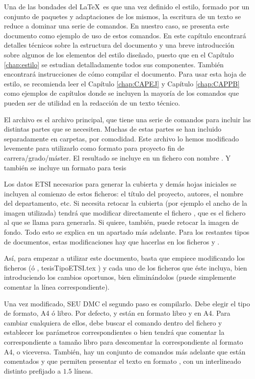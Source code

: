 Una de las bondades del \LaTeX\ es que una vez definido el estilo, formado por un conjunto de paquetes y adaptaciones de los mismos, la escritura de un texto se reduce a dominar una serie de comandos. En nuestro caso, se presenta este documento como ejemplo de uso de estos comandos. En este capítulo encontrará detalles técnicos sobre la estructura del documento y una breve introducción sobre algunos de los elementos del estilo diseñado, puesto que en el Capítulo \ref{chap:estilo} se estudian detalladamente todos sus componentes. También encontrará instrucciones de cómo compilar el documento. Para usar esta hoja de estilo, se recomienda leer el Capítulo \ref{chap:CAPEJ} y Capítulo \ref{chap:CAPPB} como ejemplos de capítulos donde se incluyen la mayoría de los comandos que pueden ser de utilidad en la redacción de un texto técnico. 

El archivo  es el archivo principal, que tiene una serie de comandos para incluir las distintas partes que se necesiten. Muchas de estas partes se han incluido separadamente en carpetas, por comodidad. Este archivo lo hemos modificado levemente para utilizarlo como formato para proyecto fin de carrera/grado/máster. El resultado se incluye en un fichero con nombre . Y también se incluye un formato para tesis 

Los datos \gls{ETSI} necesarios para generar la cubierta y demás hojas iniciales se incluyen al comienzo de estos ficheros: el título del proyecto, autores, el nombre del departamento, etc. Si necesita retocar la cubierta  (por ejemplo el ancho de la imagen utilizada)  tendrá que modificar directamente el fichero , que es el fichero al que se llama para generarla. Si quiere, también, puede retocar la imagen de fondo. Todo esto se explica en un apartado más adelante. Para los restantes tipos de documentos, estas modificaciones hay que hacerlas en los ficheros  y .

Así, para empezar a utilizar este documento, basta que empiece modificando los ficheros  (ó , {tesisTipoETSI.tex} ) y cada uno de los ficheros que éste incluya, bien introduciendo los cambios oportunos, bien eliminándolos (puede simplemente comentar la línea correspondiente).

Una vez modificado, \gls{SEU} \gls{DMC} el segundo paso es compilarlo. Debe elegir el tipo de formato, A4 ó libro. Por defecto,  y   están en formato libro y  en A4. Para cambiar cualquiera de ellos, debe buscar el comando  dentro del fichero   y establecer los parámetros correspondientes o bien tendrá que comentar la correspondiente a tamaño libro para descomentar la correspondiente al formato A4, o viceversa. También, hay un conjunto de comandos más adelante que están comentados y que permiten presentar el texto en formato , con un interlineado distinto prefijado a $1.5$ líneas. 

